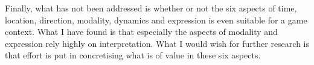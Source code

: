 Finally, what has not been addressed is whether or not the six aspects of time, location, direction, modality, dynamics and expression is even suitable for a game context. What I have found is that especially the aspects of modality and expression rely highly on interpretation. What I would wish for further research is that effort is put in concretising what is of value in these six aspects.
